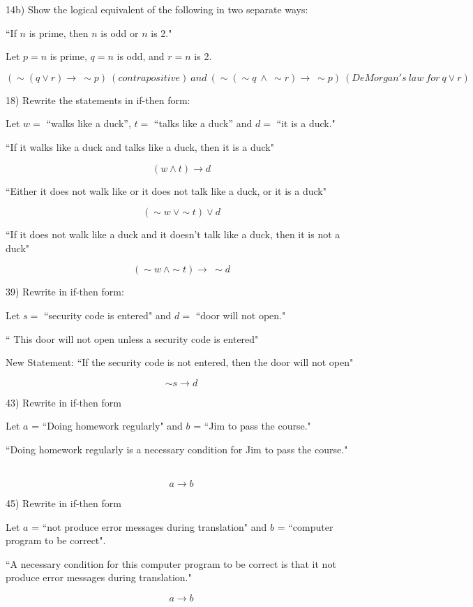 \documentclass[11pt]{article}
\begin{document}
	\begin{flushleft}
	\hrulefill
	
	14b) Show the logical equivalent of the following in two separate ways:
	
	``If $n$ is prime, then $n$ is odd or $n$ is 2."
	 
	Let $p = n$ is prime, $q = n$ is odd, and $r = n$ is 2.
	
	$$(\sim (q \lor r) \to \  \sim p)\  (contrapositive)      \ and \ (\sim (	\sim q \  \land \ \sim r) \to \ \sim p)\ (DeMorgan's\ law\ for\ q\lor r)$$
	
\hrulefill	
	
	18) Rewrite the statements in if-then form:
	
	Let $w = $ ``walks like a duck'', $t = $ ``talks like a duck'' and $d = $ ``it is a duck."
	
	``If it walks like a duck and talks like a duck, then it is a duck"
	
	$$(w \land t) \to d$$
	
	``Either it does not walk like or it does not talk like a duck, or it is a duck"
	
	$$(\sim w \ \lor \sim t) \lor d$$
	
	``If it does not walk like a duck and it doesn't talk like a duck, then it is not a duck"
	
	$$(\sim w \  \land \sim t) \to \ \sim d$$
	
\hrulefill
	
	39) Rewrite in if-then form:
	
	Let $s =$ ``security code is entered" and $d = $ ``door will not open."
	
	`` This door will not open unless a security code is entered"
	
	New Statement: ``If the security code is not entered, then the door will not open"
	
	$$\sim s \to d$$
	
\hrulefill	
	
	43) Rewrite in if-then form
	
	Let $a$ = ``Doing homework regularly" and $b$ = ``Jim to pass the course." 
	
	``Doing homework regularly is a necessary condition for Jim to pass the course." \ \ \ \ \ 
	
	$$a \to b$$

\hrulefill	
	
	45) Rewrite in if-then form
	
	Let $a$ = ``not produce error messages during translation" and $b$ = ``computer program to be correct". 
	
	``A necessary condition for this computer program to be correct is that it not produce error messages during translation."
	
	$$ a \to b$$
	
	\end{flushleft}
	\hrulefill
	
\end{document}
